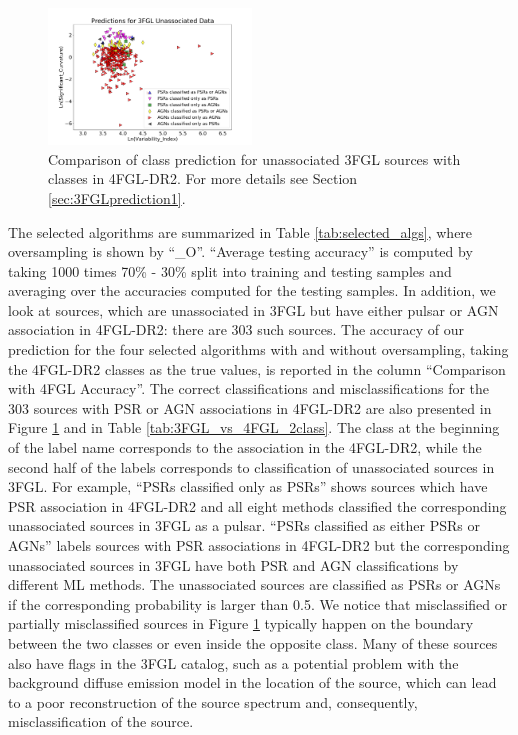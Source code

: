 \begin{figure}[h]
\centering
\includegraphics[width=0.48\textwidth]{plots/3FGL_unassoc_vs_4FGL-DR2_assoc.pdf}
\caption{Comparison of class prediction for unassociated 3FGL sources with classes in 4FGL-DR2. 
For more details see Section \ref{sec:3FGLprediction1}.}
\label{fig:3FGL_vs_4FGL_classes}
\end{figure}

The selected algorithms are summarized in Table \ref{tab:selected_algs}, where oversampling is shown by ``\_O''.
``Average testing accuracy'' is computed by taking 1000 times 70\% - 30\% split into training and testing samples and averaging over the 
accuracies computed for the testing samples.
In addition, we look at sources, which are unassociated in 3FGL but have either pulsar or AGN association in 4FGL-DR2: there are 303 such sources.
The accuracy of our prediction for the four selected algorithms with and without oversampling, taking the 4FGL-DR2 classes as the true values, is reported in the column ``Comparison with 4FGL Accuracy''.
The correct classifications and misclassifications for the 303 sources with PSR or AGN associations in 4FGL-DR2 are also presented in Figure \ref{fig:3FGL_vs_4FGL_classes} and in Table \ref{tab:3FGL_vs_4FGL_2class}.
The class at the beginning of the label name corresponds to the association in the 4FGL-DR2, while the second half of the labels corresponds to classification of unassociated sources in 3FGL. For example, ``PSRs classified only as PSRs'' shows sources which have PSR association in 4FGL-DR2 and all eight methods classified the corresponding unassociated sources in 3FGL as a pulsar. ``PSRs classified as either PSRs or AGNs'' labels sources with PSR associations in 4FGL-DR2 but the corresponding unassociated sources in 3FGL have both PSR and AGN classifications by different ML methods.
The unassociated sources are classified as PSRs or AGNs if the corresponding probability is larger than 0.5.
We notice that misclassified or partially misclassified sources in Figure \ref{fig:3FGL_vs_4FGL_classes} typically happen on the boundary between the two classes or even inside the opposite class.
Many of these sources also have flags in the 3FGL catalog, such as a potential problem with the background diffuse emission model in the location of the source, which can lead to a poor reconstruction of the source spectrum and, consequently, misclassification of the source.


